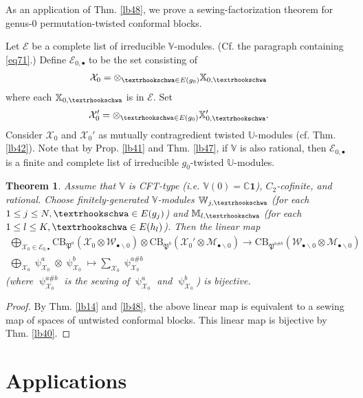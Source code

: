 \documentclass[12pt,a4paper,notitlepage]{article}
\theoremstyle{definition}
\theoremstyle{plain}
\newtheorem{thm}[df]{Theorem}
\newcommand{\fk}{\mathfrak}
\newcommand{\mc}{\mathcal}
\newcommand{\id}{\mathbf{1}}
\newcommand{\blt}{\bullet}
\newcommand{\Vbb}{\mathbb V}
\newcommand{\Ubb}{\mathbb U}
\newcommand{\Xbb}{\mathbb X}
\newcommand{\Wbb}{\mathbb W}
\newcommand{\Mbb}{\mathbb M}
\newcommand{\Cbb}{\mathbb C}
\newcommand{\CB}{\mathrm{CB}}
\newcommand{\tipae}{\text{\textrhookschwa}}
\numberwithin{equation}{subsection}
\begin{document}
As an application of Thm. \ref{lb48}, we prove a sewing-factorization theorem for genus-$0$ permutation-twisted conformal blocks.


Let $\mc E$ be a complete list of irreducible $\Vbb$-modules. (Cf. the paragraph containing \eqref{eq71}.) Define $\mc E_{0,\blt}$ to be the set consisting of
\begin{align*}
\mc X_0=\otimes_{\tipae\in E(g_0)}\Xbb_{0,\tipae}	
\end{align*}
where each $\Xbb_{0,\tipae}$ is in $\mc E$. Set
\begin{align*}
\mc X_0'=\otimes_{\tipae\in E(g_0)}\Xbb_{0,\tipae}'.	
\end{align*}	
Consider $\mc X_0$ and $\mc X_0'$  as mutually contragredient twisted $\Ubb$-modules (cf. Thm. \ref{lb42}). Note that by Prop. \ref{lb41} and Thm. \ref{lb47}, if $\Vbb$ is also rational, then $\mc E_{0,\blt}$ is a finite and complete list of irreducible $g_0$-twisted $\Ubb$-modules. 


\begin{thm}\label{lb62}
Assume that $\Vbb$ is CFT-type (i.e. $\Vbb(0)=\Cbb\id$), $C_2$-cofinite, and rational. Choose finitely-generated $\Vbb$-modules $\Wbb_{j,\tipae}$ (for each $1\leq j\leq N,\tipae\in E(g_j)$) and $\Mbb_{l,\tipae}$ (for each $1\leq l\leq K,\tipae\in E(h_l)$). Then the linear map
\begin{gather*}
\bigoplus_{\mc X_0\in\mc E_{0,\blt}}	\CB_{\fk P^a}(\mc X_0\otimes\mc W_{\blt\backslash0})\otimes 	\CB_{\fk P^b}(\mc X_0'\otimes\mc M_{\blt\backslash0})\rightarrow\CB_{\fk P^{a\#b}}(\mc W_{\blt\backslash0}\otimes \mc M_{\blt\backslash0})\\
\bigoplus_{\mc X_0} \uppsi^a_{\mc X_0}\otimes \uppsi^b_{\mc X_0}\mapsto \sum_{\mc X_0} \uppsi^{a\#b}_{\mc X_0}
\end{gather*}
(where $\uppsi^{a\#b}_{\mc X_0}$ is the sewing of $\uppsi^a_{\mc X_0}$ and $\uppsi^b_{\mc X_0}$) is bijective.
\end{thm}	


\begin{proof}
By Thm. \ref{lb14} and \ref{lb48}, the above linear map is equivalent to a sewing map of spaces of untwisted conformal blocks. This linear map is bijective by Thm. \ref{lb40}.
\end{proof}




\section{Applications}
\end{document}
